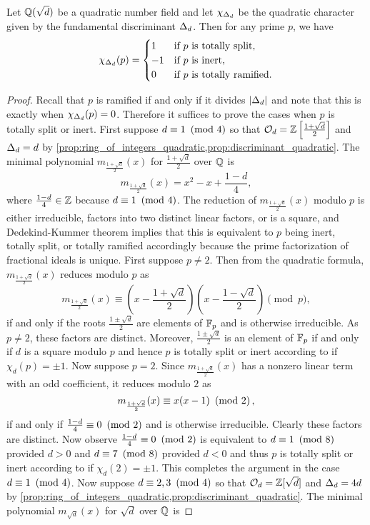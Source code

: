     \begin{proposition}\label{prop:factorization_of_primes_quadratic}
      Let $\mathbb{Q}(\sqrt{d})$ be a quadratic number field and let $\chi_{\Delta_{d}}$ be the quadratic character given by the fundamental discriminant $\Delta_{d}$. Then for any prime $p$, we have
      \[
        \chi_{\Delta_{d}}(p) = \begin{cases} 1 & \text{if $p$ is totally split}, \\ -1 & \text{if $p$ is inert}, \\ 0 & \text{if $p$ is totally ramified}. \end{cases}
      \]
    \end{proposition}
    \begin{proof}
      Recall that $p$ is ramified if and only if it divides $|\Delta_{d}|$ and note that this is exactly when $\chi_{\Delta_{d}}(p) = 0$. Therefore it suffices to prove the cases when $p$ is totally split or inert. First suppose $d \equiv 1 \ \left(\text{mod }4\right)$ so that $\mathcal{O}_{d} = \mathbb{Z}\left[\frac{1+\sqrt{d}}{2}\right]$ and $\Delta_{d} = d$ by \cref{prop:ring_of_integers_quadratic,prop:discriminant_quadratic}. The minimal polynomial $m_{\frac{1+\sqrt{d}}{2}}(x)$ for $\frac{1+\sqrt{d}}{2}$ over $\mathbb{Q}$ is
      \[
        m_{\frac{1+\sqrt{d}}{2}}(x) = x^{2}-x+\frac{1-d}{4},
      \]
      where $\frac{1-d}{4} \in \mathbb{Z}$ because $d \equiv 1 \ \left(\text{mod }4\right)$. The reduction of $m_{\frac{1+\sqrt{d}}{2}}(x)$ modulo $p$ is either irreducible, factors into two distinct linear factors, or is a square, and Dedekind-Kummer theorem implies that this is equivalent to $p$ being inert, totally split, or totally ramified accordingly because the prime factorization of fractional ideals is unique. First suppose $p \neq 2$. Then from the quadratic formula, $m_{\frac{1+\sqrt{d}}{2}}(x)$ reduces modulo $p$ as
      \[
        m_{\frac{1+\sqrt{d}}{2}}(x) \equiv \left(x-\frac{1+\sqrt{d}}{2}\right)\left(x-\frac{1-\sqrt{d}}{2}\right) \pmod{p},
      \]
      if and only if the roots $\frac{1\pm\sqrt{d}}{2}$ are elements of $\mathbb{F}_{p}$ and is otherwise irreducible. As $p \neq 2$, these factors are distinct. Moreover, $\frac{1\pm\sqrt{d}}{2}$ is an element of $\mathbb{F}_{p}$ if and only if $d$ is a square modulo $p$ and hence $p$ is totally split or inert according to if $\chi_{d}(p) = \pm1$. Now suppose $p = 2$. Since $m_{\frac{1+\sqrt{d}}{2}}(x)$ has a nonzero linear term with an odd coefficient, it reduces modulo $2$ as
      \[
        m_{\frac{1+\sqrt{d}}{2}}(x) \equiv x(x-1) \ \left(\text{mod }2\right),
      \]
      if and only if $\frac{1-d}{4} \equiv 0 \ \left(\text{mod }2\right)$ and is otherwise irreducible. Clearly these factors are distinct. Now observe $\frac{1-d}{4} \equiv 0 \ \left(\text{mod }2\right)$ is equivalent to $d \equiv 1 \ \left(\text{mod }8\right)$ provided $d > 0$ and $d \equiv 7 \ \left(\text{mod }8\right)$ provided $d < 0$ and thus $p$ is totally split or inert according to if $\chi_{d}(2) = \pm1$. This completes the argument in the case $d \equiv 1 \ \left(\text{mod }4\right)$. Now suppose $d \equiv 2,3 \ \left(\text{mod }4\right)$ so that $\mathcal{O}_{d} = \mathbb{Z}[\sqrt{d}]$ and $\Delta_{d} = 4d$ by \cref{prop:ring_of_integers_quadratic,prop:discriminant_quadratic}. The minimal polynomial $m_{\sqrt{d}}(x)$ for $\sqrt{d}$ over $\mathbb{Q}$ is

\end{proof}
